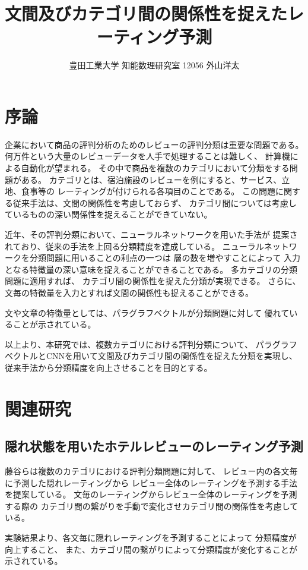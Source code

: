 \documentclass[11pt,a4paper]{ltjsarticle}
\title{文間及びカテゴリ間の関係性を捉えたレーティング予測}
\author{豊田工業大学 知能数理研究室 12056 外山洋太}
\begin{document}
\section{序論}

企業において商品の評判分析のためのレビューの評判分類は重要な問題である。
何万件という大量のレビューデータを人手で処理することは難しく、
計算機による自動化が望まれる。
その中で商品を複数のカテゴリにおいて分類をする問題がある。
カテゴリとは、宿泊施設のレビューを例にすると、サービス、立地、食事等の
レーティングが付けられる各項目のことである。
この問題に関する従来手法\cite{fujitani15}は、文間の関係性を考慮しておらず、
カテゴリ間については考慮しているものの深い関係性を捉えることができていない。

近年、その評判分類において、ニューラルネットワークを用いた手法が
提案されており、従来の手法を上回る分類精度を達成している。
ニューラルネットワークを分類問題に用いることの利点の一つは
層の数を増やすことによって
入力となる特徴量の深い意味を捉えることができることである。
多カテゴリの分類問題に適用すれば、
カテゴリ間の関係性を捉えた分類が実現できる。
さらに、文毎の特徴量を入力とすれば文間の関係性も捉えることができる。

文や文章の特徴量としては、パラグラフベクトル\cite{quoc14}が分類問題に対して
優れていることが示されている。

以上より、本研究では、複数カテゴリにおける評判分類について、
パラグラフベクトルとCNNを用いて文間及びカテゴリ間の関係性を捉えた分類を実現し、
従来手法から分類精度を向上させることを目的とする。



\section{関連研究}

\subsection{隠れ状態を用いたホテルレビューのレーティング予測}

藤谷ら\cite{fujitani15}は複数のカテゴリにおける評判分類問題に対して、
レビュー内の各文毎に予測した隠れレーティングから
レビュー全体のレーティングを予測する手法を提案している。
文毎のレーティングからレビュー全体のレーティングを予測する際の
カテゴリ間の繋がりを手動で変化させカテゴリ間の関係性を考慮している。

実験結果より、各文毎に隠れレーティングを予測することによって
分類精度が向上すること、
また、カテゴリ間の繋がりによって分類精度が変化することが示されている。
\end{document}
